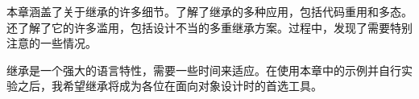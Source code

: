 本章涵盖了关于继承的许多细节。了解了继承的多种应用，包括代码重用和多态。还了解了它的许多滥用，包括设计不当的多重继承方案。过程中，发现了需要特别注意的一些情况。

继承是一个强大的语言特性，需要一些时间来适应。在使用本章中的示例并自行实验之后，我希望继承将成为各位在面向对象设计时的首选工具。
